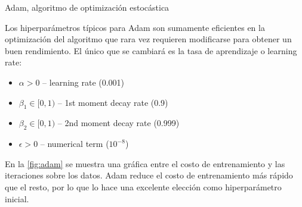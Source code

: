 \begin{algorithm}[H]
    \SetAlgoLined
    \Input{$\beta_{1}, \beta_{2} \in [0,1): $ Exponential decay rate}
    
    \caption{Adam, algoritmo de optimización estocástica}\label{alg:adam}
    \end{algorithm}

Los hiperparámetros típicos para Adam son sumamente eficientes en la
optimización del algoritmo que rara vez requieren modificarse para obtener un
buen rendimiento. El único que se cambiará es la tasa de aprendizaje o learning
rate: 

\begin{itemize}
\item $\alpha>0$ -- learning rate (0.001)
\item $\beta_1\in[0,1)$ -- 1st moment decay rate (0.9)
\item $\beta_2\in[0,1)$ -- 2nd moment decay rate (0.999)
\item $\epsilon>0$ -- numerical term ($10^{-8}$)
\end{itemize}

En la \autoref{fig:adam} se muestra una gráfica entre el costo de entrenamiento
y las iteraciones sobre los datos. Adam reduce el costo de entrenamiento más
rápido que el resto, por lo que lo hace una excelente elección como
hiperparámetro inicial.

